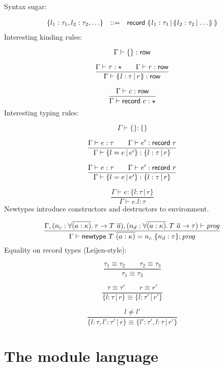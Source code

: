 \documentclass{article}
\begin{document}
Syntax sugar:

\[
\begin{array}{lcl}
\{ l_1 : \tau_1, l_2 : \tau_2, \ldots \} &::=& \textsf{record}~\llparenthesis{}\, l_1 : \tau_1 \,|\, \llparenthesis{}\, l_2 : \tau_2 \,|\, \ldots\,\rrparenthesis{}\,\,\rrparenthesis{}
\end{array}
\]
%
Interesting kinding rules:

\[
\Gamma \vdash \{\} : \textsf{row}
\]

\[
\frac{
\Gamma \vdash \tau : \star \qquad
\Gamma \vdash r : \textsf{row}
}{
\Gamma \vdash \llparenthesis{}\,l : \tau \,|\, r\,\rrparenthesis{} : \textsf{row}
}
\]

\[
\frac{
\Gamma \vdash c : \textsf{row}
}{
\Gamma \vdash \textsf{record}~c : \star
}
\]
%
Interesting typing rules:

\[
\Gamma \vdash \{\} : \{ \}
\]

\[
\frac{
\Gamma \vdash e : \tau \qquad
\Gamma \vdash e' : \textsf{record}~r
}{
\Gamma \vdash \{ l = e \,|\, e' \} : \{ l : \tau \,|\, r \}
}
\]

\[
\frac{
\Gamma \vdash e : \tau \qquad
\Gamma \vdash e' : \textsf{record}~r
}{
\Gamma \vdash \{ l = e \,|\, e' \} : \{ l : \tau \,|\, r \}
}
\]

\[
\frac{
\Gamma \vdash e : \{ l : \tau \,|\, r \}
}{
\Gamma \vdash e.l : \tau
}
\]
%
Newtypes introduce constructors and destructors to environment.

\[
\frac{
\Gamma,
(n_c : \forall \overline{(a : \kappa)}.\, \tau \rightarrow T~\overline{a}),
(n_d : \forall \overline{(a : \kappa)}.\, T~\overline{a} \rightarrow \tau)
\vdash \mathit{prog}
}{
\Gamma \vdash \mathsf{newtype}~T~\overline{(a : \kappa)} = n_c~\{ n_d : \tau \}; \mathit{prog}
}
\]
%
Equality on record types (Leijen-style):

\[
\frac{
\tau_1 \equiv \tau_2 \qquad
\tau_2 \equiv \tau_3
}{
\tau_1 \equiv \tau_3
}
\]

\[
\frac{
\tau \equiv \tau' \qquad
r \equiv r'
}{
\{ l : \tau \,|\, r \} \equiv \{ l : \tau' \,|\, r' \}
}
\]

\[
\frac{
l \neq l'
}{
\{ l : \tau, l' : \tau' \,|\, r \} \equiv \{ l' : \tau', l : \tau \,|\, r' \}
}
\]

\section{The module language}
\end{document}
